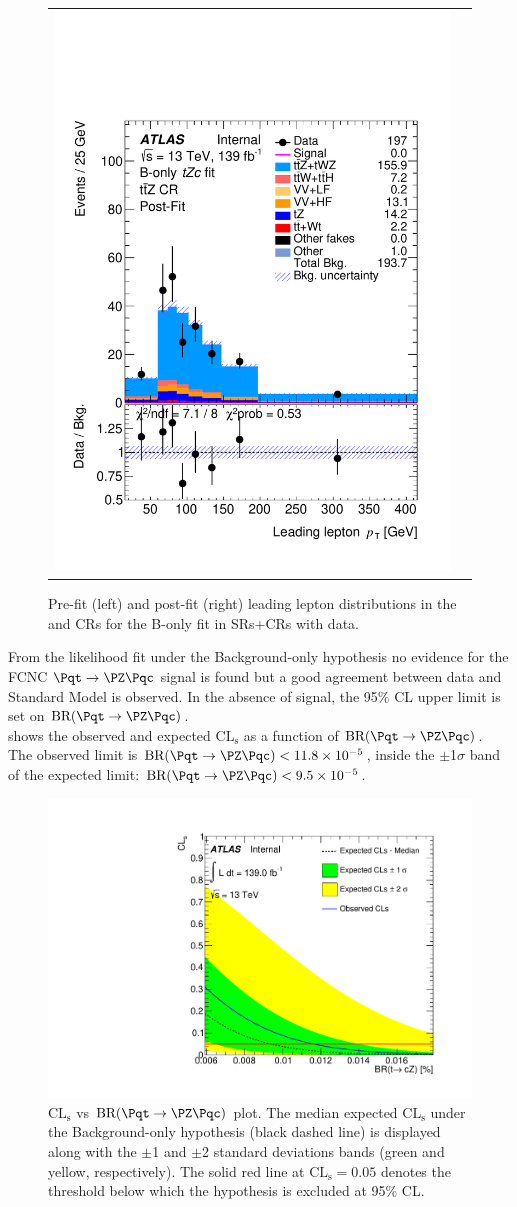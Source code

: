 \begin{figure}[htbp]
\begin{tabular}{cc}
		\includegraphics[width=.45\textwidth]{Appendices/AP10/figures/BONLY_CRSR_DL1rc_unblind/Plots/TTZCR_postFit} \\
	\end{tabular}
	\caption{Pre-fit (left) and post-fit (right) leading lepton \pt distributions in the \ttbar and \ttZ CRs for the B-only \tZc fit in SRs+CRs with data.
		\ErrStatSys
	}%
	\label{fig:stat:tzc:bonly:crsr:crplots:2_unb}
\end{figure}

\FloatBarrier
\clearpage
\noindent From the likelihood fit under the Background-only hypothesis no evidence for the FCNC $\mathrm{\Pqt\rightarrow\PZ\Pqc}$ signal is found but a good agreement between data and Standard Model is observed.
In the absence of signal, the 95\% CL upper limit is set on $\mathrm{BR (\Pqt\rightarrow\PZ\Pqc)}$.\\
 shows the observed and expected $\mathrm{CL_{s}}$ as a function of $\mathrm{BR (\Pqt\rightarrow\PZ\Pqc)}$.\\
The observed limit is $\mathrm{BR (\Pqt\rightarrow\PZ\Pqc)}<11.8\times 10^{-5}$, inside the $\pm$1$\sigma$ band of the expected limit: $\mathrm{BR (\Pqt\rightarrow\PZ\Pqc)}<9.5\times 10^{-5}$.
\begin{figure}[htbp]
	\centering
	\includegraphics[width=.6\textwidth]{Appendices/AP10/figures/BONLY_CRSR_DL1rc_unblind/CLsPlot}
	\caption{$\mathrm{CL_{s}}$ vs $\mathrm{BR (\Pqt\rightarrow\PZ\Pqc)}$ plot. The median expected $\mathrm{CL_{s}}$ under the Background-only hypothesis
		(black dashed line) is displayed along with the $\pm$1 and $\pm$2 standard deviations bands
		(green and yellow, respectively). The solid red line at $\mathrm{CL_{s}= 0.05}$ denotes the threshold below
		which the hypothesis is excluded at 95\% CL.}
	\label{fig:stat:tzc:bonly:crsr:CLsPlot}
\end{figure}

